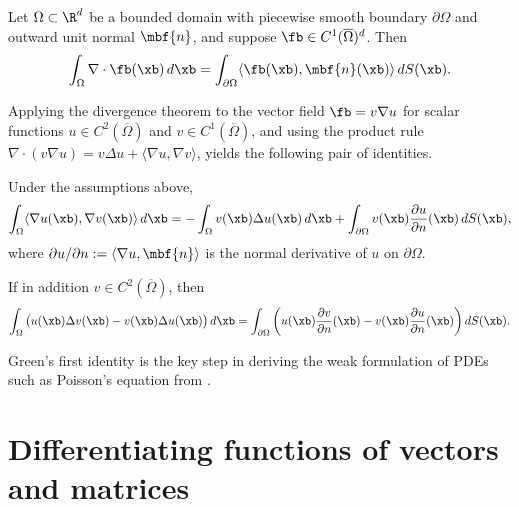\begin{theorem}
    Let $\Omega \subset \R^d$ be a bounded domain with piecewise smooth
    boundary $\partial \Omega$ and outward unit normal $\mbf{n}$, and
    suppose $\fb \in C^1(\overline\Omega)^d$. Then
    \begin{equation*}
        \int_\Omega \nabla \cdot \fb(\xb) \, d\xb =
        \int_{\partial \Omega} \langle \fb(\xb), \mbf{n}(\xb) \rangle \, dS(\xb).
    \end{equation*}
\end{theorem}
Applying the divergence theorem to the vector field $\fb = v \nabla u$
for scalar functions $u \in C^2(\overline\Omega)$ and $v \in
C^1(\overline\Omega)$, and using the product rule $\nabla \cdot (v
\nabla u) = v \Delta u + \langle \nabla u, \nabla v \rangle$, yields the
following pair of identities.

\begin{corollary}
    \label{cor:greens-first-identity}
    Under the assumptions above,
    \begin{equation*}
        \int_\Omega \langle \nabla u(\xb), \nabla v(\xb) \rangle \, d\xb
        = - \int_\Omega v(\xb) \Delta u(\xb) \, d\xb +
        \int_{\partial \Omega} v(\xb) \frac{\partial u}{\partial n}(\xb)
        \, dS(\xb),
    \end{equation*}
    where $\partial u/\partial n := \langle \nabla u, \mbf{n} \rangle$
    is the normal derivative of $u$ on $\partial \Omega$.
\end{corollary}

\begin{corollary}
    If in addition $v \in C^2(\overline\Omega)$, then
    \begin{equation*}
        \int_\Omega \big( u(\xb) \Delta v(\xb) - v(\xb) \Delta u(\xb)
        \big) \, d\xb =
        \int_{\partial \Omega} \left(
            u(\xb) \frac{\partial v}{\partial n}(\xb) -
            v(\xb) \frac{\partial u}{\partial n}(\xb)
        \right) dS(\xb).
    \end{equation*}
\end{corollary}
Green's first identity is the key step in deriving the weak formulation
of PDEs such as Poisson's equation from .


\section{Differentiating functions of vectors and matrices}

